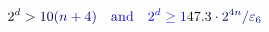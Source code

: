 \documentclass[12pt]{article}
\begin{document}
\makeatletter
\renewcommand*{\@textcolor}[3]{%
  \protect\leavevmode
  \begingroup
    \color#1{#2}#3%
  \endgroup
}
\makeatother
\begin{displaymath}
\mathcolor[RGB]{0,0,15}{2} ^ { \mathcolor[RGB]{0,0,30}{d} } \mathcolor[RGB]{0,0,45}{>} \mathcolor[RGB]{0,0,60}{1} \mathcolor[RGB]{0,0,75}{0} \mathcolor[RGB]{0,0,90}{(} \mathcolor[RGB]{0,0,105}{n} \mathcolor[RGB]{0,0,120}{+} \mathcolor[RGB]{0,0,135}{4} \mathcolor[RGB]{0,0,150}{)} \quad \mathrm { \mathcolor[RGB]{0,0,165}{a} \mathcolor[RGB]{0,0,180}{n} \mathcolor[RGB]{0,0,195}{d} } \quad \mathcolor[RGB]{0,0,210}{2} ^ { \mathcolor[RGB]{0,0,225}{d} } \mathcolor[RGB]{0,0,240}{\geq} \mathcolor[RGB]{0,0,255}{1} \mathcolor[RGB]{0,15,0}{4} \mathcolor[RGB]{0,15,15}{7} \mathcolor[RGB]{0,15,30}{.} \mathcolor[RGB]{0,15,45}{3} \mathcolor[RGB]{0,15,60}{\cdot} \mathcolor[RGB]{0,15,75}{2} ^ { \mathcolor[RGB]{0,15,90}{4} \mathcolor[RGB]{0,15,105}{n} } \mathcolor[RGB]{0,15,120}{/} \mathcolor[RGB]{0,15,135}{\varepsilon} _ { \mathcolor[RGB]{0,15,150}{6} }
\end{displaymath}
\end{document}
